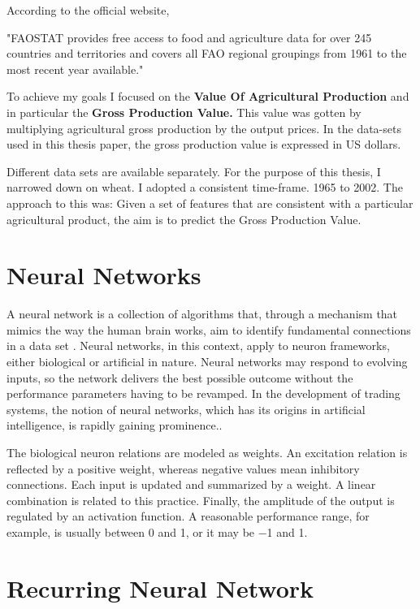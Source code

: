 According to the official website,\cite{division_2000}
\begin{displayquote}
	"FAOSTAT provides free access to food and agriculture data for over 245 countries and territories and covers all FAO regional groupings from 1961 to the most recent year available."
\end{displayquote} 

To achieve my goals I focused on the \textbf{Value Of Agricultural Production} and in particular the \textbf{Gross Production Value.} This value was gotten by multiplying agricultural gross production by the output prices. In the data-sets used in this thesis paper, the gross production value is expressed in US dollars. 



Different data sets are available separately. For the purpose of this thesis, I narrowed down on wheat. I adopted a consistent time-frame. 1965 to 2002. The approach to this was: Given a set of features that are consistent with a particular agricultural product, the aim is to predict the Gross Production Value.

\section{Neural Networks}
A neural network is a collection of algorithms that, through a mechanism that mimics the way the human brain works, aim to identify fundamental connections in a data set \cite{jain1999recurrent}.  Neural networks, in this context, apply to neuron frameworks, either biological or artificial in nature. Neural networks may respond to evolving inputs, so the network delivers the best possible outcome without the performance parameters having to be revamped. In the development of trading systems, the notion of neural networks, which has its origins in artificial intelligence, is rapidly gaining prominence.\citealp*{krose1993introduction}.


The biological neuron relations are modeled as weights. An excitation relation is reflected by a positive weight, whereas negative values mean inhibitory connections. Each input is updated and summarized by a weight. A linear combination is related to this practice. Finally, the amplitude of the output is regulated by an activation function. A reasonable performance range, for example, is usually between 0 and 1, or it may be −1 and 1.

\section{Recurring Neural Network}

